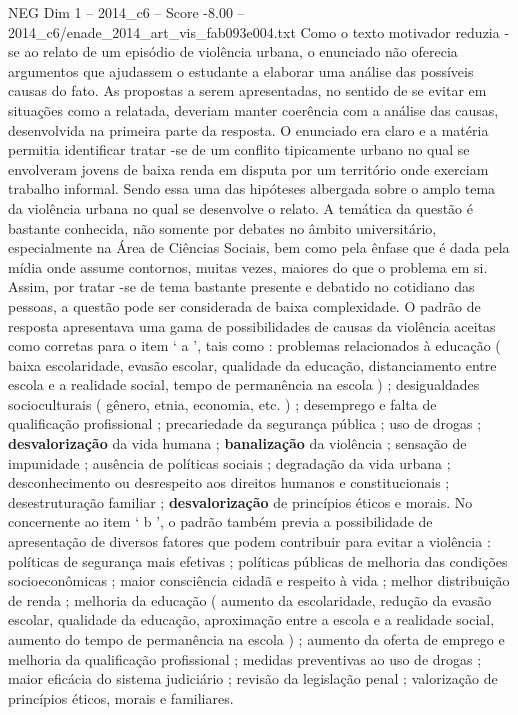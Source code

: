 \begin{textsample}{NEG Dim 1 – 2014\_c6 – Score -8.00 – 2014\_c6/enade\_2014\_art\_vis\_fab093e004.txt}
Como o texto motivador reduzia -se ao relato de um episódio de violência urbana, o enunciado não oferecia argumentos que ajudassem o estudante a elaborar uma análise das possíveis causas do fato.
As propostas a serem apresentadas, no sentido de se evitar em situações como a relatada, deveriam manter coerência com a análise das causas, desenvolvida na primeira parte da resposta.
O enunciado era claro e a matéria permitia identificar tratar -se de um conflito tipicamente urbano no qual se envolveram jovens de baixa renda em disputa por um território onde exerciam trabalho informal.
Sendo essa uma das hipóteses albergada sobre o amplo tema da violência urbana no qual se desenvolve o relato.
A temática da questão é bastante conhecida, não somente por debates no âmbito universitário, especialmente na Área de Ciências Sociais, bem como pela ênfase que é dada pela mídia onde assume contornos, muitas vezes, maiores do que o problema em si.
Assim, por tratar -se de tema bastante presente e debatido no cotidiano das pessoas, a questão pode ser considerada de baixa complexidade.
O padrão de resposta apresentava uma gama de possibilidades de causas da violência aceitas como corretas para o item ‘ a ’, tais como : problemas relacionados à educação ( baixa escolaridade, evasão escolar, qualidade da educação, distanciamento entre escola e a realidade social, tempo de permanência na escola ) ; desigualdades socioculturais ( gênero, etnia, economia, etc. ) ; desemprego e falta de qualificação profissional ; precariedade da segurança pública ; uso de drogas ; \textbf{desvalorização} da vida humana ; \textbf{banalização} da violência ; sensação de impunidade ; ausência de políticas sociais ; degradação da vida urbana ; desconhecimento ou desrespeito aos direitos humanos e constitucionais ; desestruturação familiar ; \textbf{desvalorização} de princípios éticos e morais.
No concernente ao item ‘ b ’, o padrão também previa a possibilidade de apresentação de diversos fatores que podem contribuir para evitar a violência : políticas de segurança mais efetivas ; políticas públicas de melhoria das condições socioeconômicas ; maior consciência cidadã e respeito à vida ; melhor distribuição de renda ; melhoria da educação ( aumento da escolaridade, redução da evasão escolar, qualidade da educação, aproximação entre a escola e a realidade social, aumento do tempo de permanência na escola ) ; aumento da oferta de emprego e melhoria da qualificação profissional ; medidas preventivas ao uso de drogas ; maior eficácia do sistema judiciário ; revisão da legislação penal ; valorização de princípios éticos, morais e familiares.

\end{textsample}
